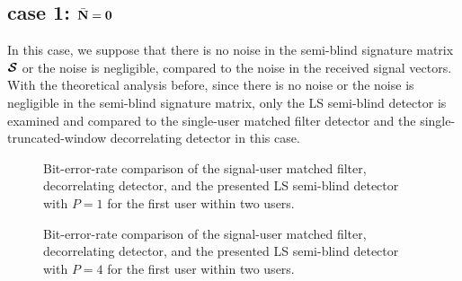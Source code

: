 \documentclass[a4paper,11pt,fleqn]{article}
\newcommand{\bN}{{\bf N}}
\newcommand{\bcS}{{\mbox {\boldmath ${\cal S}$}}}
\begin{document}
\subsection*{case 1: $\bar{\bN} = \mathbf{0}$}

In this case, we suppose that there is no noise in the semi-blind
signature matrix $\bcS$ or the noise is negligible, compared to
the noise in the received signal vectors. With the theoretical
analysis before, since there is no noise or the noise is
negligible in the semi-blind signature matrix, only the LS
semi-blind detector is examined and compared to the single-user
matched filter detector and the single-truncated-window
decorrelating detector in this case.

\begin{figure}
\caption{Bit-error-rate comparison of the signal-user matched
filter, decorrelating detector, and the presented LS semi-blind
detector with $P=1$ for the first user within two users.}
\label{LS10}
\end{figure}

\begin{figure}
\caption{Bit-error-rate comparison of the signal-user matched
filter, decorrelating detector, and the presented LS semi-blind
detector with $P=4$ for the first user within two users.}
\label{LS40}
\end{figure}
\end{document}
